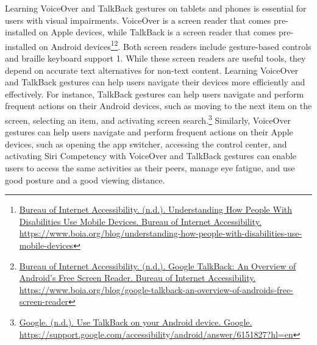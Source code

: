 Learning VoiceOver and TalkBack gestures on tablets and phones is essential for users with visual impairments. VoiceOver is a screen reader that comes pre-installed on Apple devices, while TalkBack is a screen reader that comes pre-installed on Android devices\footnote{\raggedright \href{https://www.boia.org/blog/understanding-how-people-with-disabilities-use-mobile-devices}{Bureau of Internet Accessibility. (n.d.). Understanding How People With Disabilities Use Mobile Devices. Bureau of Internet Accessibility. } \break\url{https://www.boia.org/blog/understanding-how-people-with-disabilities-use-mobile-devices}}\fnsep\footnote{\raggedright \href{https://www.boia.org/blog/google-talkback-an-overview-of-androids-free-screen-reader}{Bureau of Internet Accessibility. (n.d.). Google TalkBack: An Overview of Android’s Free Screen Reader. Bureau of Internet Accessibility.}  \break\url{https://www.boia.org/blog/google-talkback-an-overview-of-androids-free-screen-reader}}. Both screen readers include gesture-based controls and braille keyboard support 1. While these screen readers are useful tools, they depend on accurate text alternatives for non-text content. Learning VoiceOver and TalkBack gestures can help users navigate their devices more efficiently and effectively. For instance, TalkBack gestures can help users navigate and perform frequent actions on their Android devices, such as moving to the next item on the screen, selecting an item, and activating screen search.\footnote{\raggedright \href{https://support.google.com/accessibility/android/answer/6151827?hl=en}{Google. (n.d.). Use TalkBack on your Android device. Google. } \break\url{https://support.google.com/accessibility/android/answer/6151827?hl=en}} Similarly, VoiceOver gestures can help users navigate and perform frequent actions on their Apple devices, such as opening the app switcher, accessing the control center, and activating Siri Competency with VoiceOver and TalkBack gestures can enable users to access the same activities as their peers, manage eye fatigue, and use good posture and a good viewing distance.

